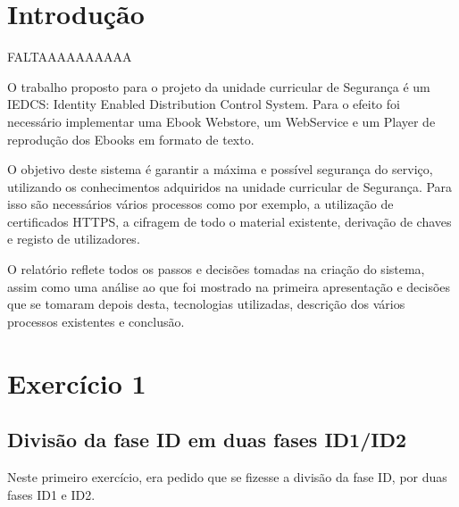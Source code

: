 \documentclass[pdftex,12pt,a4paper]{report}
\begin{document}
\renewcommand{\headrulewidth}{0pt}

\fancyhead{}
\fancyfoot{}
\rfoot{\thepage}

\renewcommand*\contentsname{Conteúdos}
\renewcommand*\figurename{Figura}
\renewcommand*\tablename{Tabela}

\tableofcontents
\renewcommand{\headrulewidth}{0.15pt}
\renewcommand{\thechapter}{}


\clearpage

\section{Introdução}

FALTAAAAAAAAAA

O trabalho proposto para o projeto da unidade curricular de Segurança é um IEDCS: Identity Enabled Distribution Control System. Para o  efeito foi necessário implementar uma Ebook Webstore, um WebService e um Player de reprodução dos Ebooks em formato de texto.

O objetivo deste sistema é garantir a máxima e possível segurança do serviço, utilizando os conhecimentos adquiridos na unidade curricular de Segurança. Para isso são necessários vários processos como por exemplo, a utilização de certificados HTTPS, a cifragem de todo o material existente, derivação de chaves e registo de utilizadores.	

O relatório reflete todos os passos e decisões tomadas na criação do sistema, assim como uma análise ao que foi mostrado na primeira apresentação e decisões que se tomaram depois desta, tecnologias utilizadas, descrição dos vários processos existentes e conclusão.

\newpage
\section{Exercício 1}

\subsection{Divisão da fase ID em duas fases ID1/ID2}
Neste primeiro exercício, era pedido que se fizesse a divisão da fase ID, por duas fases ID1 e ID2.
\end{document}
